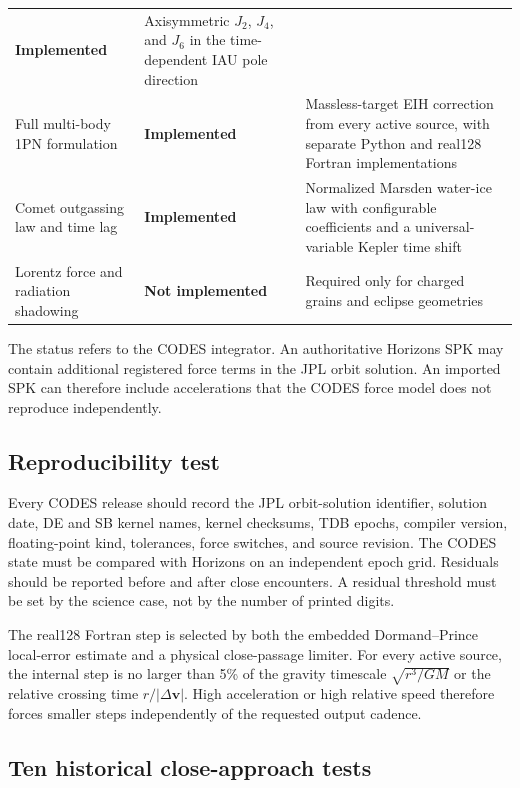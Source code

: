 \begin{table}
\begin{tabular}{@{}M{43mm}C{37mm}M{85mm}@{}}
\color{cTeal}\textbf{Implemented} &
Axisymmetric $J_2$, $J_4$, and $J_6$ in the time-dependent IAU pole
direction\\
\cmidrule(lr){1-3}
Full multi-body 1PN formulation &
\color{cTeal}\textbf{Implemented} &
Massless-target EIH correction from every active source, with separate
Python and real128 Fortran implementations\\
\cmidrule(lr){1-3}
Comet outgassing law and time lag &
\color{cTeal}\textbf{Implemented} &
Normalized Marsden water-ice law with configurable coefficients and a
universal-variable Kepler time shift\\
\cmidrule(lr){1-3}
Lorentz force and radiation shadowing &
\color{cOrange}\textbf{Not implemented} &
Required only for charged grains and eclipse geometries\\
\bottomrule
\end{tabular}
\end{table}

The status refers to the CODES integrator. An authoritative Horizons SPK may
contain additional registered force terms in the JPL orbit solution. An
imported SPK can therefore include accelerations that the CODES force model
does not reproduce independently.

\subsection{Reproducibility test}

Every CODES release should record the JPL orbit-solution identifier, solution date,
DE and SB kernel names, kernel checksums, TDB epochs, compiler version,
floating-point kind, tolerances, force switches, and source revision. The
CODES state must be compared with Horizons on an independent epoch grid.
Residuals should be reported before and after close encounters. A residual
threshold must be set by the science case, not by the number of printed
digits.

The real128 Fortran step is selected by both the embedded
Dormand--Prince local-error estimate and a physical close-passage limiter.
For every active source, the internal step is no larger than 5\% of the
gravity timescale $\sqrt{r^3/GM}$ or the relative crossing time
$r/|\Delta\mathbf v|$. High acceleration or high relative speed therefore
forces smaller steps independently of the requested output cadence.

\subsection{Ten historical close-approach tests}
\label{sec:historical-ca-tests}

